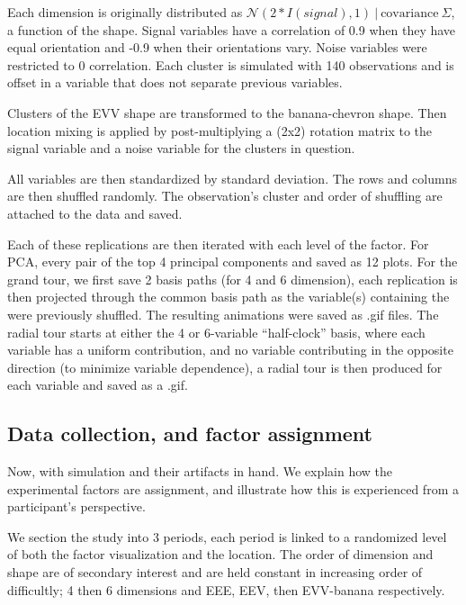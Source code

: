 \documentclass{template/monashthesis}
\begin{document}
Each dimension is originally distributed as \(\mathcal{N}(2 * I(signal), 1)~|~\text{covariance}~\Sigma\), a function of the shape. Signal variables have a correlation of 0.9 when they have equal orientation and -0.9 when their orientations vary. Noise variables were restricted to 0 correlation. Each cluster is simulated with 140 observations and is offset in a variable that does not separate previous variables.

Clusters of the EVV shape are transformed to the banana-chevron shape. Then location mixing is applied by post-multiplying a (2x2) rotation matrix to the signal variable and a noise variable for the clusters in question.

All variables are then standardized by standard deviation. The rows and columns are then shuffled randomly. The observation's cluster and order of shuffling are attached to the data and saved.

Each of these replications are then iterated with each level of the factor. For PCA, every pair of the top 4 principal components and saved as 12 plots. For the grand tour, we first save 2 basis paths (for 4 and 6 dimension), each replication is then projected through the common basis path as the variable(s) containing the were previously shuffled. The resulting animations were saved as .gif files. The radial tour starts at either the 4 or 6-variable ``half-clock'' basis, where each variable has a uniform contribution, and no variable contributing in the opposite direction (to minimize variable dependence), a radial tour is then produced for each variable and saved as a .gif.

\hypertarget{data-collection-and-factor-assignment}{%
\subsection{Data collection, and factor assignment}\label{data-collection-and-factor-assignment}}

Now, with simulation and their artifacts in hand. We explain how the experimental factors are assignment, and illustrate how this is experienced from a participant's perspective.

We section the study into 3 periods, each period is linked to a randomized level of both the factor visualization and the location. The order of dimension and shape are of secondary interest and are held constant in increasing order of difficultly; 4 then 6 dimensions and EEE, EEV, then EVV-banana respectively.
\end{document}
